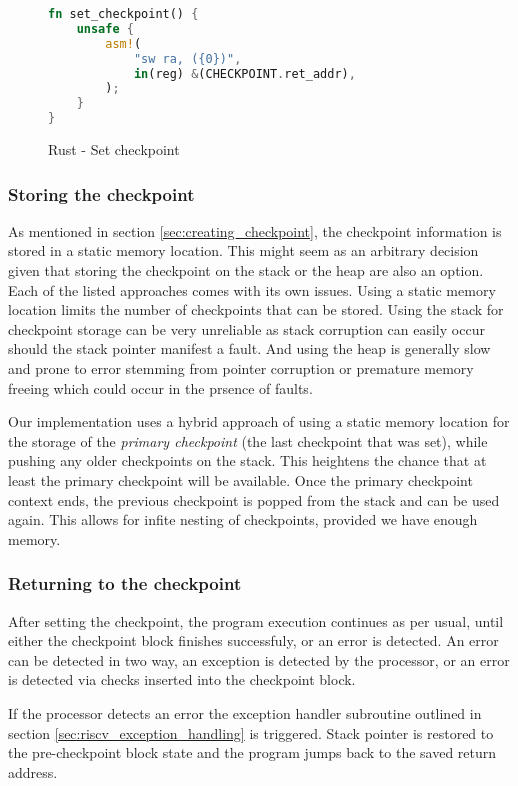 \begin{figure}[!h]
\begin{lstlisting}[language=Rust]
fn set_checkpoint() {
    unsafe {
        asm!(
            "sw ra, ({0})",
            in(reg) &(CHECKPOINT.ret_addr),
        );
    }
}
\end{lstlisting}
\caption{Rust - Set checkpoint}
\label{fig:rust_set_checkpoint}
\end{figure}

\subsubsection{Storing the checkpoint}

As mentioned in section \ref{sec:creating_checkpoint}, the checkpoint information is stored in a static memory location. This might seem as an arbitrary decision given that storing the checkpoint on the stack or the heap are also an option. Each of the listed approaches comes with its own issues. Using a static memory location limits the number of checkpoints that can be stored. Using the stack for checkpoint storage can be very unreliable as stack corruption can easily occur should the stack pointer manifest a fault. And using the heap is generally slow and prone to error stemming from pointer corruption or premature memory freeing which could occur in the prsence of faults.

Our implementation uses a hybrid approach of using a static memory location for the storage of the \textit{primary checkpoint} (the last checkpoint that was set), while pushing any older checkpoints on the stack. This heightens the chance that at least the primary checkpoint will be available. Once the primary checkpoint context ends, the previous checkpoint is popped from the stack and can be used again. This allows for infite nesting of checkpoints, provided we have enough memory.

\subsubsection{Returning to the checkpoint}

After setting the checkpoint, the program execution continues as per usual, until either the checkpoint block finishes successfuly, or an error is detected. An error can be detected in two way, an exception is detected by the processor, or an error is detected via checks inserted into the checkpoint block.

If the processor detects an error the exception handler subroutine outlined in section \ref{sec:riscv_exception_handling} is triggered. Stack pointer is restored to the pre-checkpoint block state and the program jumps back to the saved return address.

